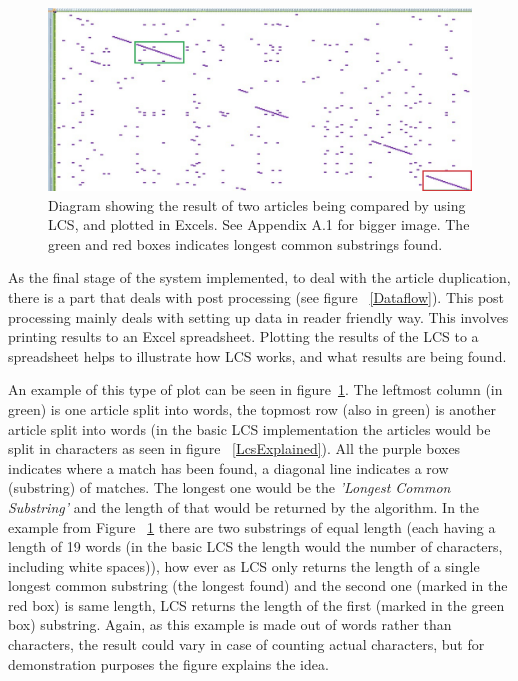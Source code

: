\begin{figure}
	\centering
	\includegraphics[scale=0.4]{figures/LcsExample}
	\caption{Diagram showing the result of two articles being compared by using LCS, and plotted in Excels. See Appendix A.1 for bigger image. The green and red boxes indicates longest common substrings found.}
	\label{LcsEx}
\end{figure}

As the final stage of the system implemented, to deal with the article duplication, there is a part that deals with post processing (see figure ~\ref{Dataflow}). This post processing mainly deals with setting up data in reader friendly way. This involves printing results to an Excel spreadsheet. Plotting the results of the LCS to a spreadsheet helps to illustrate how LCS works, and what results are being found. 

An example of this type of plot can be seen in figure~\ref{LcsEx}. The leftmost column (in green) is one article split into words, the topmost row (also in green) is another article split into words (in the basic LCS implementation the articles would be split in characters as seen in figure ~\ref{LcsExplained}). All the purple boxes indicates where a match has been found, a diagonal line indicates a row (substring) of matches. The longest one would be the \textit{'Longest Common Substring'} and the length of that would be returned by the algorithm. In the example from Figure ~\ref{LcsEx} there are two substrings of equal length (each having a length of 19 words (in the basic LCS the length would the number of characters, including white spaces)), how ever as LCS only returns the length of a single longest common substring (the longest found) and the second one (marked in the red box) is same length, LCS returns the length of the first (marked in the green box) substring. Again, as this example is made out of words rather than characters, the result could vary in case of counting actual characters, but for demonstration purposes the figure explains the idea.

